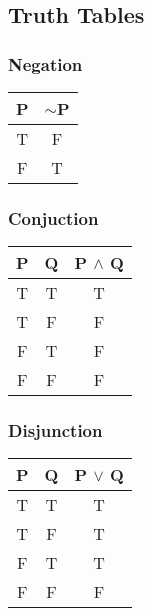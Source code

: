 \begin{multicols}{2}

\subsection{Truth Tables}

\subsubsection{Negation}

\begin{table}[H]
\centering
\begin{tabular}[t]{|c|c|}
\hline
\textbf{P} & \textbf{$\sim$P} \\ \hline
T & F \\ \hline
F & T \\ \hline
\end{tabular}
\end{table}

\subsubsection{Conjuction}

\begin{table}[H]
\centering
\begin{tabular}[t]{|c|c|c|}
\hline
\textbf{P} & \textbf{Q} & \textbf{P $\land$ Q} \\ \hline
T & T & T \\ \hline
T & F & F \\ \hline
F & T & F \\ \hline
F & F & F \\ \hline
\end{tabular}
\end{table}

\subsubsection{Disjunction}

\begin{table}[H]
\centering
\begin{tabular}[t]{|c|c|c|}
\hline
\textbf{P} & \textbf{Q} & \textbf{P $\lor$ Q} \\ \hline
T & T & T \\ \hline
T & F & T \\ \hline
F & T & T \\ \hline
F & F & F \\ \hline
\end{tabular}
\end{table}


\end{multicols}
